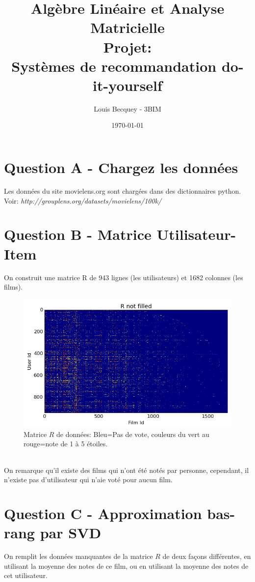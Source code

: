 \documentclass[12pt,a4paper]{article}
\begin{document}
\title{Algèbre Linéaire et Analyse Matricielle\\ Projet: \\ Systèmes de recommandation do-it-yourself}
\date{\today}
\author{Louis Becquey - 3BIM}
\maketitle
\newpage

\section{Question A - Chargez les données}
Les données du site movielens.org sont chargées dans des dictionnaires python.\\

Voir: \textit{http://grouplens.org/datasets/movielens/100k/}
\section{Question B - Matrice Utilisateur-Item}
On construit une matrice R de 943 lignes (les utilisateurs) et 1682 colonnes (les films).
\begin{figure}[h!]
	\centering
	\includegraphics[scale=0.5]{R-Not-Filled.png}
	\caption{Matrice $R$ de données: Bleu=Pas de vote, couleurs du vert au rouge=note de 1 à 5 étoiles.}
\end{figure}
\\
On remarque qu'il existe des films qui n'ont été notés par personne, cependant, il n'existe pas d'utilisateur qui n'aie voté pour aucun film.
\newpage

\section{Question C - Approximation bas-rang par SVD}
On remplit les données manquantes de la matrice $R$ de deux façons différentes, en utilisant la moyenne des notes de ce film, ou en utilisant la moyenne des notes de cet utilisateur.\\
\end{document}
